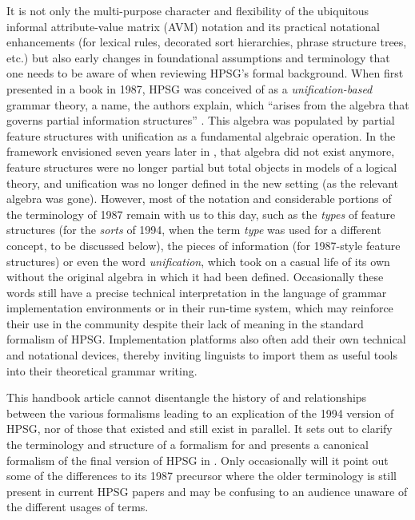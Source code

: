 \documentclass[output=paper
                ,modfonts
                ,nonflat
	        ,collection
	        ,collectionchapter
	        ,collectiontoclongg
 	        ,biblatex
                ,babelshorthands
                ,newtxmath
                ,draftmode
                ,colorlinks, citecolor=brown
]{./langsci/langscibook}
\begin{document}
{It is not only the multi-purpose character and flexibility of the ubiquitous informal attribute-value matrix (AVM) notation and its
practical notational enhancements (for lexical rules, decorated sort
hierarchies, phrase structure trees, etc.) but also early changes in
foundational assumptions and terminology that one needs to
be aware of when reviewing HPSG's formal background. When first
presented in a book in 1987, HPSG was conceived of as a
\emph{unification-based} grammar theory, a name, the authors
explain, which ``arises from the algebra that governs partial
information structures'' \citep[7]{PollardSag1987}. This algebra was
populated by partial feature structures with unification as a
fundamental algebraic operation. In the framework envisioned seven
years later in \citet{PollardSag1994},
that algebra did not exist anymore, feature structures were no longer
partial but total objects in models of a logical theory, and
unification was no longer defined in the new setting (as the relevant
algebra was gone). However, most of the notation and considerable
portions of the terminology of 1987 remain with us to this day, such as the
\emph{types} of feature structures (for the \emph{sorts} of 1994,
when the term \emph{type} was used for a different concept, to be
discussed below), the pieces of information (for 1987-style feature
structures) or even the word \emph{unification}, which took on a
casual life of its own without the original algebra in
which it had been defined. Occasionally these words still have a
precise technical interpretation in the language of grammar
implementation environments or in their run-time system, which may
reinforce their use in the community despite their lack of meaning in
the standard formalism of HPSG. Implementation platforms also often add
their own technical and notational devices, thereby
inviting linguists to import them as useful tools into their theoretical grammar
writing.



This handbook article cannot disentangle the history of and relationships
between the various formalisms leading to an explication of the
1994 version of HPSG, nor of those that existed and still exist in
parallel. It sets out to clarify the terminology and
structure of a formalism for \cite{PollardSag1994} and
presents a canonical formalism of the final version of
HPSG in \cite{PollardSag1994}. Only occasionally will it point out some of
the differences to its 1987 precursor where
the older terminology is still present in current HPSG papers and
may be confusing to an audience unaware of the different
usages of terms.

}
\end{document}
